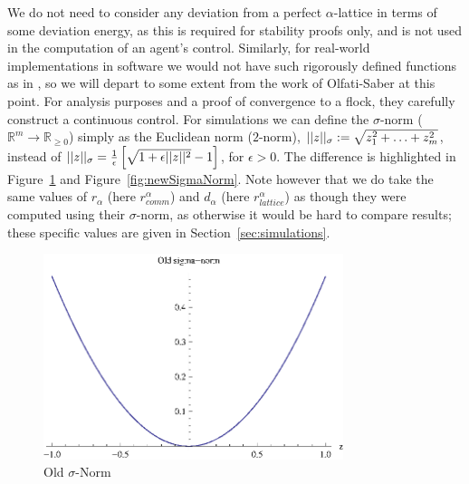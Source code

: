 \documentclass[10pt, conference]{IEEEtran}
\begin{document}
We do not need to consider any deviation from a perfect $\alpha$-lattice in terms of some deviation energy, as this is required for stability proofs only, and is not used in the computation of an agent's control.
%
Similarly, for real-world implementations in software we would not have such rigorously defined functions as in \cite{os2006}, so we will depart to some extent from the work of Olfati-Saber at this point.
%
For analysis purposes and a proof of convergence to a flock, they carefully construct a continuous control.
%
For simulations we can define the $\sigma$-norm ($\mathbb{R}^m \rightarrow \mathbb{R}_{\geq 0}$) simply as the Euclidean norm ($2$-norm), $\lvert\lvert z\rvert\rvert_{\sigma} := \sqrt{z_1^2 + \ldots + z_m^2}$, instead of $\lvert\lvert z\rvert\rvert_{\sigma} = \frac{1}{\epsilon}\left[\sqrt{1 + \epsilon\lvert\lvert z\rvert\rvert^2} - 1\right]$, for $\epsilon > 0$.  The difference is highlighted in Figure~\ref{fig:oldSigmaNorm} and Figure~\ref{fig:newSigmaNorm}.
%
Note however that we do take the same values of $r_{\alpha}$ (here $r_{comm}^{\alpha}$) and $d_{\alpha}$ (here $r_{lattice}^{\alpha}$) as though they were computed using their $\sigma$-norm, as otherwise it would be hard to compare results; these specific values are given in Section~\ref{sec:simulations}.

\begin{figure}[!htb]
  \begin{center}
    \includegraphics[width=3.45in]{sigmaNormOld}
  \end{center}

  \caption{\small Old $\sigma$-Norm}
  \label{fig:oldSigmaNorm}
\end{figure}
\end{document}
